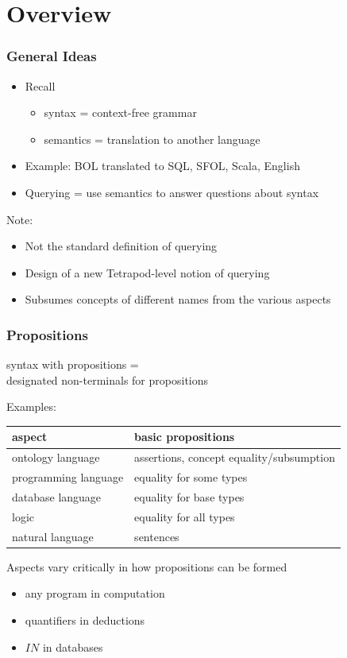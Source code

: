 \section{Overview}

\begin{frame}\frametitle{General Ideas}
\begin{itemize}
\item Recall
 \begin{itemize}
 \item syntax = context-free grammar
 \item semantics = translation to another language
 \end{itemize}
\item Example: BOL translated to SQL, SFOL, Scala, English
\item Querying = use semantics to answer questions about syntax
\end{itemize}
\medskip

Note:
\begin{itemize}
\item Not the standard definition of querying
\item Design of a new Tetrapod-level notion of querying
\item Subsumes concepts of different names from the various aspects
\end{itemize}
\end{frame}

\begin{frame}\frametitle{Propositions}
syntax with propositions = \\
designated non-terminals for propositions
\medskip

Examples:
\begin{center}
\footnotesize
\begin{tabular}{l|l}
aspect & basic propositions\\
\hline
ontology language & assertions, concept equality/subsumption\\
programming language & equality for some types\\
database language & equality for base types \\
logic & equality for all types\\
natural language & sentences \\
\end{tabular}
\end{center}

Aspects vary critically in how propositions can be formed
\begin{itemize}
\item any program in computation
\item quantifiers in deductions 
\item $IN$ in databases
\end{itemize}
\end{frame}

